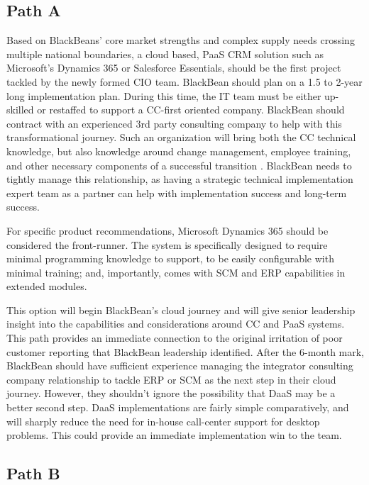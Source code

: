 \subsection{Path A}

Based on BlackBeans' core market strengths and complex supply needs crossing multiple national boundaries, a cloud based, PaaS CRM solution such as Microsoft's Dynamics 365 or Salesforce Essentials, should be the first project tackled by the newly formed CIO team. BlackBean should plan on a 1.5 to 2-year long implementation plan. During this time, the IT team must be either up-skilled or restaffed to support a CC-first oriented company. BlackBean should contract with an experienced 3rd party consulting company to help with this transformational journey. Such an organization will bring both the CC technical knowledge, but also knowledge around change management, employee training, and other necessary components of a successful transition \parencite{farhanSystematicReviewDetermination2018}. BlackBean needs to tightly manage this relationship, as having a strategic technical implementation expert team as a partner can help with implementation success and long-term success.

For specific product recommendations, Microsoft Dynamics 365 should be considered the front-runner. The system is specifically designed to require minimal programming knowledge to support, to be easily configurable with minimal training; and, importantly, comes with SCM and ERP capabilities in extended modules.

This option will begin BlackBean's cloud journey and will give senior leadership insight into the capabilities and considerations around CC and PaaS systems. This path provides an immediate connection to the original irritation of poor customer reporting that BlackBean leadership identified. After the 6-month mark, BlackBean should have sufficient experience managing the integrator consulting company relationship to tackle ERP or SCM as the next step in their cloud journey. However, they shouldn't ignore the possibility that DaaS may be a better second step. DaaS implementations are fairly simple comparatively, and will sharply reduce the need for in-house call-center support for desktop problems. This could provide an immediate implementation win to the team.

\subsection{Path B}

